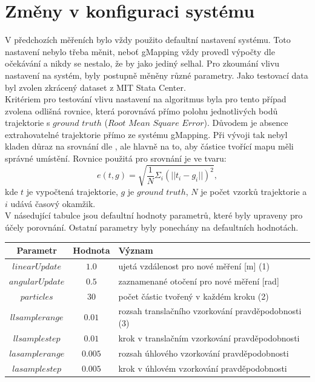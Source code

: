 \documentclass[12pt]{report}
\begin{document}
\section{Změny v konfiguraci systému} \label{sekce:config}
V předchozích měřeních bylo vždy použito defaultní nastavení systému. Toto nastavení nebylo třeba měnit, neboť gMapping vždy provedl výpočty dle očekávání a nikdy se nestalo, že by jako jediný selhal. Pro zkoumání vlivu nastavení na systém, byly postupně měněny různé parametry. Jako testovací data byl zvolen zkrácený dataset z MIT Stata Center.\\
\indent Kritériem pro testování vlivu nastavení na algoritmus byla pro tento případ zvolena odlišná rovnice, která porovnává přímo polohu jednotlivých bodů trajektorie s $ground$ $truth$ ($Root$ $Mean$ $Square$ $Error$). Důvodem je absence extrahovatelné trajektorie přímo ze systému gMapping. Při vývoji tak nebyl kladen důraz na srovnání dle \cite{Kuemmerle2009}, ale hlavně na to, aby částice tvořící mapu měli správné umístění. Rovnice použitá pro srovnání je ve tvaru:
\begin{equation}
	e(t,g)=\sqrt{\frac{1}{N}\Sigma_i(||t_i-g_i||)^2},
\end{equation}
kde $t$ je vypočtená trajektorie, $g$ je $ground$ $truth$, $N$ je počet vzorků trajektorie a $i$ udává časový okamžik.\\
\indent V násedující tabulce jsou defaultní hodnoty parametrů, které byly upraveny pro účely porovnání. Ostatní parametry byly ponechány na defaultních hodnotách. 
\begin{center}
	\begin{tabular}{c|c|p{9.5cm}}
		\bfseries Parametr  & \bfseries Hodnota & \bfseries Význam \\ [2mm]
		\hline
		$linearUpdate$ & $1.0$ & ujetá vzdálenost pro nové měření [m]  (1)\\
		$angularUpdate$ & $0.5$ & zaznamenané otočení pro nové měření [rad]\\
		\hline
		$particles$ & $30$ & počet částic tvořený v každém kroku  (2)\\
		\hline
		$llsamplerange$ & $0.01$ & rozsah translačního vzorkování pravděpodobnosti (3)\\
		$llsamplestep$ & $0.01$ & krok v translačním vzorkování pravděpodobnosti\\
		$lasamplerange$ & $0.005$ & rozsah úhlového vzorkování pravděpodobnosti\\
		$lasamplestep$ & $0.005$ & krok v úhlovém vzorkování pravděpodobnosti\\
	\end{tabular}
\end{center}
\end{document}
